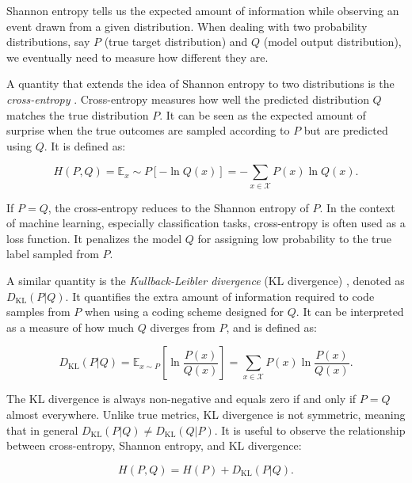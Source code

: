 Shannon entropy tells us the expected amount of information while observing an event drawn from a given distribution. When dealing with two probability distributions, say $P$ (true target distribution) and $Q$ (model output distribution), we eventually need to measure how different they are.

A quantity that extends the idea of Shannon entropy to two distributions is the \emph{cross-entropy} \cite{bengio2017deep}. Cross-entropy measures how well the predicted distribution $Q$ matches the true distribution $P$. It can be seen as the expected amount of surprise when the true outcomes are sampled according to $P$ but are predicted using $Q$. It is defined as:

\begin{equation} 
    \label{eq:cross-entropy} 
    H(P, Q) = \mathbb{E}{_x \sim P}[-\ln Q(x)] = - \sum_{x \in \mathcal{X}} P(x) \ln Q(x). 
\end{equation}

If $P = Q$, the cross-entropy reduces to the Shannon entropy of $P$. In the context of machine learning, especially classification tasks, cross-entropy is often used as a loss function. It penalizes the model $Q$ for assigning low probability to the true label sampled from $P$.

A similar quantity is the \emph{Kullback-Leibler divergence} (KL divergence) \cite{bengio2017deep}, denoted as $D_{\mathrm{KL}}(P | Q)$. It quantifies the extra amount of information required to code samples from $P$ when using a coding scheme designed for $Q$. It can be interpreted as a measure of how much $Q$ diverges from $P$, and is defined as:

\begin{equation} 
    \label{eq:kl-divergence} 
    D_{\mathrm{KL}}(P | Q) = 
    \mathbb{E}_{x \sim P} \left[ \ln \frac{P(x)}{Q(x)} \right] = \sum_{x \in \mathcal{X}} P(x) \ln \frac{P(x)}{Q(x)}. 
\end{equation}

The KL divergence is always non-negative and equals zero if and only if $P = Q$ almost everywhere. Unlike true metrics, KL divergence is not symmetric, meaning that in general $D_{\mathrm{KL}}(P | Q) \neq D_{\mathrm{KL}}(Q | P)$. It is useful to observe the relationship between cross-entropy, Shannon entropy, and KL divergence:

\begin{equation} 
    \label{eq:cross-entropy-kl} 
    H(P, Q) = H(P) + D_{\mathrm{KL}}(P | Q).
\end{equation}

